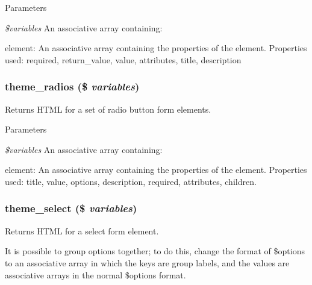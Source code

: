 \begin{DoxyParams}{Parameters}
\item[{\em \$variables}]An associative array containing:
\begin{DoxyItemize}
\item element: An associative array containing the properties of the element. Properties used: required, return\_\-value, value, attributes, title, description 
\end{DoxyItemize}\end{DoxyParams}
\hypertarget{group__themeable_gafcfb357ed36fd4f881d6f8f29d67a762}{
\subsubsection[{theme\_\-radios}]{\setlength{\rightskip}{0pt plus 5cm}theme\_\-radios (\$ {\em variables})}}
\label{group__themeable_gafcfb357ed36fd4f881d6f8f29d67a762}
Returns HTML for a set of radio button form elements.


\begin{DoxyParams}{Parameters}
\item[{\em \$variables}]An associative array containing:
\begin{DoxyItemize}
\item element: An associative array containing the properties of the element. Properties used: title, value, options, description, required, attributes, children. 
\end{DoxyItemize}\end{DoxyParams}
\hypertarget{group__themeable_ga1d5214969fb2a9be57eb444d3ec0ade2}{
\subsubsection[{theme\_\-select}]{\setlength{\rightskip}{0pt plus 5cm}theme\_\-select (\$ {\em variables})}}
\label{group__themeable_ga1d5214969fb2a9be57eb444d3ec0ade2}
Returns HTML for a select form element.

It is possible to group options together; to do this, change the format of \$options to an associative array in which the keys are group labels, and the values are associative arrays in the normal \$options format.


